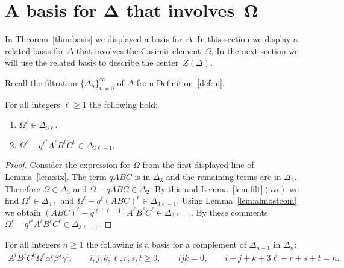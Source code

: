 \section[A basis for~$\Delta $ that involves~$\Omega$]{A basis for $\boldsymbol{\Delta}$ that involves~$\boldsymbol{\Omega}$}

 In Theorem~\ref{thm:basis} we displayed a basis for
$\Delta $. In this section we display a related
basis for $\Delta $ that involves the Casimir element~$\Omega$.
In the next section we will use the related basis
to describe  the center~$Z(\Delta )$.

 Recall the f\/iltration $\lbrace \Delta_n \rbrace_{n=0}^\infty$
of $\Delta $ from Def\/inition~\ref{def:ui}.


\begin{Lemma}
\label{lem:omegapower}
For all integers $\ell \geq 1$
the following hold:
\begin{enumerate}\itemsep=0pt
\item[$(i)$] $\Omega^\ell \in \Delta_{3 \ell}$.
\item[$(ii)$] $\Omega^\ell -q^{\ell^2}A^\ell B^\ell C^\ell  \in
\Delta_{3\ell-1}$.
\end{enumerate}
\end{Lemma}

\begin{proof}
Consider the expression for $\Omega$ from the
f\/irst displayed line of
Lemma~\ref{lem:six}.
The term $qABC$ is in $\Delta_3$
and the remaining terms are in $\Delta_2$. Therefore
$\Omega \in \Delta_3$ and $\Omega-qABC \in \Delta_2$. By this and
Lemma~\ref{lem:filt}$(iii)$ we f\/ind
$\Omega^\ell \in \Delta_{3\ell}$ and
$\Omega^\ell - q^\ell (ABC)^\ell
\in \Delta_{3\ell-1}$.
Using Lemma~\ref{lem:almostcom}  we obtain
$(ABC)^\ell -q^{\ell (\ell-1)}A^\ell B^\ell C^\ell \in \Delta_{3\ell -1}$.
By these comments
$\Omega^\ell -q^{\ell^2}A^\ell B^\ell C^\ell  \in \Delta_{3\ell-1}$.
\end{proof}

\begin{Lemma}
\label{lem:basis2c}
For all integers $n\geq 1$
the following is a basis
for a complement of
$\Delta_{n-1}$ in $\Delta_n$:
\begin{gather*}
 A^iB^jC^k\Omega^\ell \alpha^r \beta^s \gamma^t, \qquad
i,j,k,\ell, r,s,t\geq 0,
\qquad ijk=0,
 \qquad
i+j+k+3\ell+r+s+t = n.
\end{gather*}
\end{Lemma}


